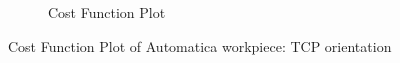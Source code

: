 \begin{figure}[!htbp]
\begin{subfigure}[b]{0.4\textwidth}
		\caption{Cost Function Plot}  
		\label{fig:cp4a}
	\end{subfigure}	
	\caption{Cost Function Plot of Automatica workpiece: TCP orientation}
	\label{fig:cp4}
\end{figure}

